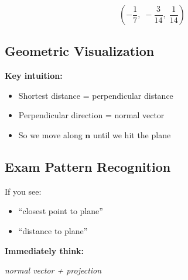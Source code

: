 \documentclass[11pt]{article}
\begin{document}
\[
\boxed{
\left(
-\frac{1}{7},\;
-\frac{3}{14},\;
\frac{1}{14}
\right)
}
\]

\hrulefill

\subsection*{Geometric Visualization}

\begin{center}
\end{center}

\textbf{Key intuition:}
\begin{itemize}
    \item Shortest distance = perpendicular distance
    \item Perpendicular direction = normal vector
    \item So we move along $\mathbf{n}$ until we hit the plane
\end{itemize}

\hrulefill

\subsection*{Exam Pattern Recognition}

If you see:
\begin{itemize}
    \item ``closest point to plane''
    \item ``distance to plane''
\end{itemize}

\textbf{Immediately think:}
\begin{center}
\textit{normal vector + projection}
\end{center}
\end{document}
